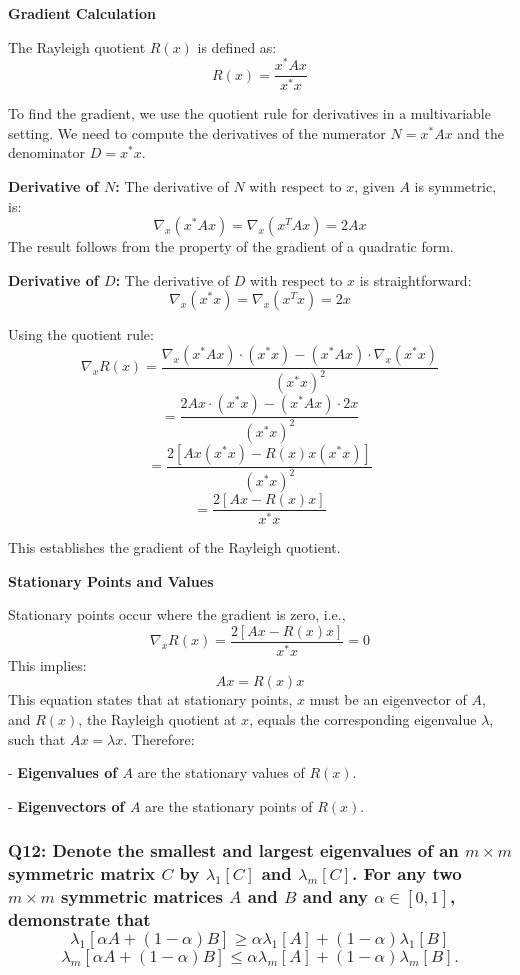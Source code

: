 \documentclass[8pt]{article}
\begin{document}
{{\textbf{Gradient Calculation}

The Rayleigh quotient \( R(x) \) is defined as:
\[
R(x) = \frac{x^* A x}{x^* x}
\]

To find the gradient, we use the quotient rule for derivatives in a multivariable setting. We need to compute the derivatives of the numerator \(N = x^* A x\) and the denominator \(D = x^* x\).

\textbf{Derivative of \(N\):}
The derivative of \(N\) with respect to \(x\), given \(A\) is symmetric, is:
\[
\nabla_x (x^* A x) = \nabla_x (x^T A x) = 2Ax
\]
The result follows from the property of the gradient of a quadratic form.

\textbf{Derivative of \(D\):}
The derivative of \(D\) with respect to \(x\) is straightforward:
\[
\nabla_x (x^* x) = \nabla_x (x^T x) = 2x
\]

Using the quotient rule:
\[
\nabla_x R(x) = \frac{\nabla_x (x^* A x) \cdot (x^* x) - (x^* A x) \cdot \nabla_x (x^* x)}{(x^* x)^2}
\]
\[
= \frac{2Ax \cdot (x^* x) - (x^* A x) \cdot 2x}{(x^* x)^2}
\]
\[
= \frac{2[Ax (x^* x) - R(x) x (x^* x)]}{(x^* x)^2}
\]
\[
= \frac{2[Ax - R(x)x]}{x^* x}
\]

This establishes the gradient of the Rayleigh quotient.

\textbf{Stationary Points and Values}

Stationary points occur where the gradient is zero, i.e., 
\[
\nabla_x R(x) = \frac{2[Ax - R(x)x]}{x^* x} = 0
\]
This implies:
\[
Ax = R(x) x
\]
This equation states that at stationary points, \(x\) must be an eigenvector of \(A\), and \(R(x)\), the Rayleigh quotient at \(x\), equals the corresponding eigenvalue \(\lambda\), such that \(Ax = \lambda x\). Therefore:

- \textbf{Eigenvalues of \(A\)} are the stationary values of \(R(x)\).

- \textbf{Eigenvectors of \(A\)} are the stationary points of \(R(x)\).


\subsubsection*{Q12: Denote the smallest and largest eigenvalues of an \(m \times m\) symmetric matrix \(C\) by \(\lambda_1[C]\) and \(\lambda_m[C]\). For any two \(m \times m\) symmetric matrices \(A\) and \(B\) and any \(\alpha \in [0, 1]\), demonstrate that
\[
\lambda_1[\alpha A + (1 - \alpha)B] \geq \alpha \lambda_1[A] + (1 - \alpha) \lambda_1[B]
\]
\[
\lambda_m[\alpha A + (1 - \alpha)B] \leq \alpha \lambda_m[A] + (1 - \alpha) \lambda_m[B].
\]
}

}}
\end{document}
